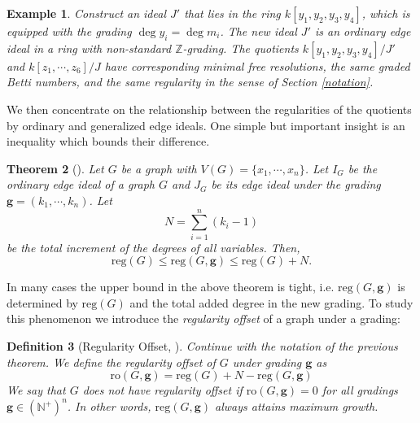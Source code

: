 \documentclass[dvipsnames,10pt]{article}
\newtheorem{theorem}{Theorem}[section]
\newtheorem{defi}[theorem]{Definition}
\newtheorem{example}[theorem]{Example}
\begin{document}
\begin{example}
Construct an ideal $J'$ that lies in the ring $k[y_1,y_2,y_3,y_4]$, which is equipped with the grading $\deg y_i=\deg m_i$. The new ideal $J'$ is an ordinary edge ideal in a ring with non-standard $\mathbb{Z}$-grading. The quotients $k[y_1,y_2,y_3,y_4]/J'$ and $k[z_1,\cdots,z_6]/J$ have corresponding minimal free resolutions, the same graded Betti numbers, and the same regularity in the sense of Section \ref{notation}.









\end{example}


We then concentrate on the relationship between the regularities of the quotients by ordinary and generalized edge ideals. One simple but important insight is an inequality which bounds their difference.

\begin{theorem}[]
    Let $G$ be a graph with $V(G)=\{x_1,\cdots,x_n\}$. Let $I_G$ be the ordinary edge ideal of a graph $G$ and $J_G$ be its edge ideal under the grading $\mathbf{g}=(k_1,\cdots,k_n)$. Let
    \begin{equation*}
        N=\sum_{i=1}^n(k_i-1)
    \end{equation*}
    be the total increment of the degrees of all variables. Then,
    \begin{equation*}
        \mathrm{reg}(G) \leqslant \mathrm{reg}(G,\mathbf{g}) \leqslant \mathrm{reg}(G)+N.
    \end{equation*}
\end{theorem}

In many cases the upper bound in the above theorem is tight, i.e. $\mathrm{reg}(G,\mathbf{g})$ is determined by $\mathrm{reg}(G)$ and the total added degree in the new grading. To study this phenomenon we introduce the \emph{regularity offset} of a graph under a grading:


\begin{defi}[Regularity Offset, ]
    Continue with the notation of the previous theorem. We define the regularity offset of $G$ under grading $\mathbf{g}$ as
    \begin{equation*}
        \mathrm{ro}(G,\mathbf{g})=\mathrm{reg}(G)+N-\mathrm{reg}(G,\mathbf{g})
    \end{equation*}
    We say that $G$ does not have regularity offset if $\mathrm{ro}(G,\mathbf{g})= 0$ for all gradings $\mathbf{g}\in (\mathbb{N}^+)^n$. In other words, $\mathrm{reg}(G,\mathbf{g})$ always attains maximum growth.
\end{defi}
\end{document}
